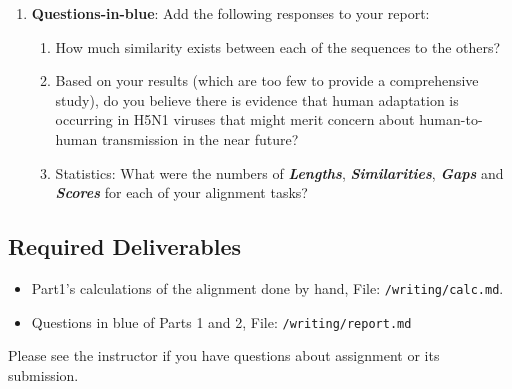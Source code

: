 \begin{enumerate}
	\item \color{blue}\textbf{Questions-in-blue}: \color{black} Add the following responses to your report:
	\begin{enumerate}
		\item \color{blue} How much similarity exists between each of the sequences to the others? \color{black}
		\item \color{blue} Based on your results (which are too few to provide a comprehensive study), do you believe there is evidence that human adaptation is occurring in H5N1 viruses that might merit concern about human-to-human transmission in the near future? \color{black}
		\item \color{blue} Statistics: What were the numbers of \textbf{\emph{Lengths}}, \textbf{\emph{Similarities}}, \textbf{\emph{Gaps}} and \textbf{\emph{Scores}} for each of your alignment tasks? \color{black}
	\end{enumerate}
\end{enumerate}


\color{red}
\vspace*{-.2in}
\subsection*{Required Deliverables}
\vspace*{-.1in}
    \begin{itemize}
     \item Part1's calculations of the alignment done by hand, File: {\tt /writing/calc.md}. 
     \item Questions in blue of Parts 1 and 2, File: {\tt /writing/report.md}
    \end{itemize}
\color{black}


\noindent Please see the instructor if you have questions about assignment or its submission.



